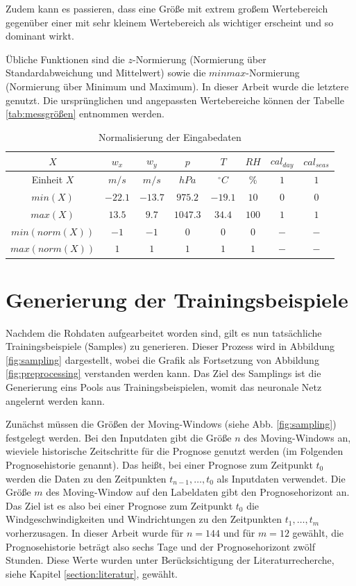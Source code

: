 \documentclass[
12pt, %
toc=listofnumbered, %
toc=chapterentrydotfill, %
numbers=noenddot, %
captions=tableheading, %
bibliography=numbered
]{scrreprt}
\let\Oldsection\section
\renewcommand{\section}{\FloatBarrier\Oldsection}
\begin{document}
Zudem kann es passieren, dass eine Größe mit extrem großem Wertebereich gegenüber einer mit sehr kleinem Wertebereich als wichtiger erscheint und so dominant wirkt.

Übliche Funktionen sind die $z$-Normierung (Normierung über Standardabweichung und Mittelwert) sowie die $minmax$-Normierung (Normierung über Minimum und Maximum). In dieser Arbeit wurde die letztere genutzt. Die ursprünglichen und angepassten Wertebereiche können der Tabelle \ref{tab:messgrößen} entnommen werden.

\begin{table}[ht]
	\centering
	\caption{Normalisierung der Eingabedaten}
	\begin{tabular}{|c|c|c|c|c|c|c|c|}
		\hline
		\rowcolor{color80}
		\textbf{$X$} & \textbf{$w_x$} & \textbf{$w_y$} & \textbf{$p$} & \textbf{$T$} & \textbf{$RH$} & \textbf{$cal_{day}$} & \textbf{$cal_{seas}$} \\ \hline
		Einheit $X$ & $m/s$ & $m/s$ & $hPa$ & $^\circ C$ & \% & $1$ & $1$ \\ \hline
		$min(X)$       & $-22.1$ & $-13.7$ & $975.2$ & $-19.1$ & $10$ & $0$ & $0$ \\ \hline
		$max(X)$       & $13.5$ & $9.7$ & $1047.3$ & $34.4$ & $100$ & $1$ & $1$ \\ \hline
		$min(norm(X))$ & $-1$ & $-1$ & $0$ & $0$ & $0$ & $-$ & $-$ \\ \hline
		$max(norm(X))$ & $1$ & $1$ & $1$ & $1$ & $1$ & $-$ & $-$ \\ \hline
	\end{tabular}
\label{tab:normalisierung}
\end{table}

\section{Generierung der Trainingsbeispiele}
Nachdem die Rohdaten aufgearbeitet worden sind, gilt es nun tatsächliche Trainingsbeispiele (Samples) zu generieren. Dieser Prozess wird in Abbildung \ref{fig:sampling} dargestellt, wobei die Grafik als Fortsetzung von Abbildung \ref{fig:preprocessing} verstanden werden kann. Das Ziel des Samplings ist die Generierung eins Pools aus Trainingsbeispielen, womit das neuronale Netz angelernt werden kann.

Zunächst müssen die Größen der Moving-Windows (siehe Abb. \ref{fig:sampling}) festgelegt werden. Bei den Inputdaten gibt die Größe $n$ des Moving-Windows an, wieviele historische Zeitschritte für die Prognose genutzt werden (im Folgenden Prognosehistorie genannt). Das heißt, bei einer Prognose zum Zeitpunkt $t_0$ werden die Daten zu den Zeitpunkten $t_{n-1}, \dots, t_0$ als Inputdaten verwendet. Die Größe $m$ des Moving-Window auf den Labeldaten gibt den Prognosehorizont an. Das Ziel ist es also bei einer Prognose zum Zeitpunkt $t_0$ die Windgeschwindigkeiten und Windrichtungen zu den Zeitpunkten $t_1, \dots, t_m$ vorherzusagen. In dieser Arbeit wurde für $n=144$ und für $m=12$ gewählt, die Prognosehistorie beträgt also sechs Tage und der Prognosehorizont zwölf Stunden. Diese Werte wurden unter Berücksichtigung der Literaturrecherche, siehe Kapitel \ref{section:literatur}, gewählt.
\end{document}
